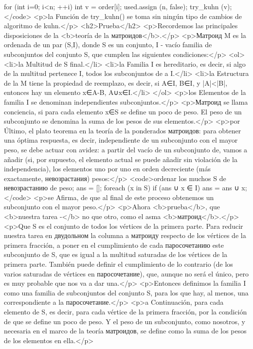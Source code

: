 for (int i=0; i<n; ++i) {
int v = order[i];
used.assign (n, false);
try_kuhn (v);
}</code>
<p>la Función de try_kuhn() se toma sin ningún tipo de cambios de algoritmo de kuhn.</p>
<h2>Prueba</h2>
<p>Recordemos las principales disposiciones de la <b>teoría de la матроидов</b>.</p>
<p>Матроид M es la ordenada de un par (S,I), donde S es un conjunto, I - vacío familia de subconjuntos del conjunto S, que cumplen las siguientes condiciones:</p>
<ol>
<li>la Multitud de S final.</li>
<li>la Familia I es hereditario, es decir, si algo de la multitud pertenece I, todos los subconjuntos de a I.</li>
<li>la Estructura de la M tiene la propiedad de reemplazo, es decir, si A∈I, B∈I, y |A|<|B|, entonces hay un elemento x∈A-B, A∪x∈I.</li>
</ol>
<p>los Elementos de la familia I se denominan independientes subconjuntos.</p>
<p>Матроид se llama conciencia, si para cada elemento x∈S se define un poco de peso. El peso de un subconjunto se denomina la suma de los pesos de sus elementos.</p>
<p>por Último, el plato teorema en la teoría de la ponderados матроидов: para obtener una óptima respuesta, es decir, independiente de un subconjunto con el mayor peso, se debe actuar con avidez: a partir del vacío de un subconjunto de, vamos a añadir (si, por supuesto, el elemento actual se puede añadir sin violación de la independencia), los elementos uno por uno en orden decreciente (más exactamente, невозрастания) pesos:</p>
<code>ordenar los muchos S de невозрастанию de peso;
ans = [];
foreach (x in S)
if (ans ∪ x ∈ I)
ans = ans ∪ x;</code>
<p>se Afirma, de que al final de este proceso obtenemos un subconjunto con el mayor peso.</p>
<p>Ahora <b>prueba</b>, que <b>nuestra tarea -</b> no que otro, como el asma <b>матроид</b>.</p>
<p>Que S es el conjunto de todos los vértices de la primera parte. Para reducir nuestra tarea en двудольном la columna a матроиду respecto de los vértices de la primera fracción, a poner en el cumplimiento de cada паросочетанию este subconjunto de S, que es igual a la multitud saturadas de los vértices de la primera parte. También puede definir el cumplimiento de lo contrario (de los varios saturadas de vértices en паросочетание), que, aunque no será el único, pero es muy probable que nos va a dar una.</p>
<p>Entonces definimos la familia I como una familia de subconjuntos del conjunto S, para los que hay, al menos, una correspondiente a la паросочетание.</p>
<p>a Continuación, para cada elemento de S, es decir, para cada vértice de la primera fracción, por la condición de que se define un poco de peso. Y el peso de un subconjunto, como nosotros, y necesaria en el marco de la teoría матроидов, se define como la suma de los pesos de los elementos en ella.</p>
